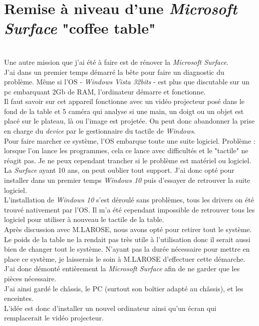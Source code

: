 \chapter{Remise à niveau d'une \textit{Microsoft Surface} "coffee table"}\\

Une autre mission que j'ai été à faire est de rénover la \textit{Microsoft Surface}.\\

J'ai dans un premier temps démarré la bête pour faire un diagnostic du problème. Même si l'OS - \textit{Windows Vista 32bits} - est plus que discutable sur un pc embarquant 2Gb de RAM, l'ordinateur démarre et fonctionne.\\

Il faut savoir sur cet appareil fonctionne avec un vidéo projecteur posé dans le fond de la table et 5 caméra qui analyse si une main, un doigt ou un objet est placé sur le plateau, là ou l'image est projetée. On peut donc abandonner la prise en charge du \textit{device} par le gestionnaire du tactile de \textit{Windows}.\\

Pour faire marcher ce système, l'OS embarque toute une suite logiciel. Problème : lorsque l'on lance les programmes, cela ce lance avec difficultés et le "tactile" ne réagit pas. Je ne peux cependant trancher si le problème est matériel ou logiciel.\\

La \textit{Surface} ayant 10 ans, on peut oublier tout support. J'ai donc opté pour installer dans un premier temps \textit{Windows 10} puis d'essayer de retrouver la suite logiciel.\\

L'installation de \textit{Windows 10} s'est déroulé sans problèmes, tous les drivers on été trouvé nativement par l'OS. Il m'a été cependant impossible de retrouver tous les logiciel pour utiliser à nouveau le tactile de la table.\\

Après discussion avec M.LAROSE, nous avons opté pour retirer tout le système. Le poids de la table ne la rendait pas très utile à l'utilisation donc il serait aussi bien de changer tout le système. N'ayant pas la durée nécessaire pour mettre en place ce système, je laisserais le soin à M.LAROSE d'effectuer cette démarche.\\

J'ai donc démonté entièrement la \textit{Microsoft Surface} afin de ne garder que les pièces nécessaire.\\
J'ai ainsi gardé le châssis, le PC (surtout son boîtier adapté au châssis), et les enceintes.\\

L'idée est donc d'installer un nouvel ordinateur ainsi qu'un écran qui remplacerait le vidéo projecteur. 
